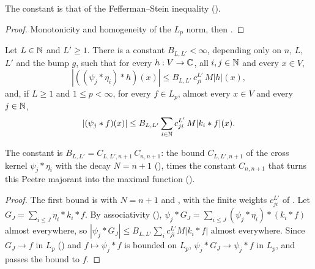 The constant is that of the Fefferman--Stein inequality ().

\begin{proof}
\leanok
Monotonicity and homogeneity of the $L_p$ norm, then .
\end{proof}

\begin{theorem}
\label{thm:blocks-by-local-means}
\leanok
{}
Let $L \in \mathbb{N}$ and $L' \geq 1$. There is a constant $B_{L,L'} < \infty$, depending only on $n$,
$L$, $L'$ and the bump $g$, such that for every $h : V \to \mathbb{C}$, all $i, j \in \mathbb{N}$ and every
$x \in V$,
\[
  |((\psi_j * \eta_i) * h)(x)| \leq B_{L,L'} \, c^{L'}_{ji} \, M|h|(x) ,
\]
and, if $L \geq 1$ and $1 \leq p < \infty$, for every $f \in L_p$, almost every $x \in V$ and
every $j \in \mathbb{N}$,
\[
  |(\psi_j * f)(x)| \leq B_{L,L'} \sum_{i \in \mathbb{N}} c^{L'}_{ji} \, M|k_i * f|(x) .
\]
\end{theorem}

The constant is $B_{L,L'} = C_{L,L',n+1} \, C_{n,n+1}$: the bound $C_{L,L',n+1}$ of the cross
kernel $\psi_j * \eta_i$ with the decay $N = n + 1$ (), times the
constant $C_{n,n+1}$ that turns this Peetre majorant into the maximal function
().

\begin{proof}
\leanok
The first bound is  with $N = n + 1$ and
, with the finite weights $c^{L'}_{ji}$ of
. Let
$G_J = \sum_{i \leq J} \eta_i * k_i * f$. By associativity (),
$\psi_j * G_J = \sum_{i \leq J} (\psi_j * \eta_i) * (k_i * f)$ almost everywhere, so
$|\psi_j * G_J| \leq B_{L,L'} \sum_i c^{L'}_{ji} M|k_i * f|$ almost everywhere. Since
$G_J \to f$ in $L_p$ () and $f \mapsto \psi_j * f$ is bounded on
$L_p$, $\psi_j * G_J \to \psi_j * f$ in $L_p$, and  passes the
bound to $f$.
\end{proof}

